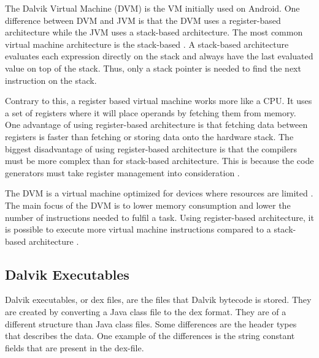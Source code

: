 
The Dalvik Virtual Machine (DVM) is the VM initially used on Android. One difference between DVM and JVM is that the DVM uses a register-based architecture while the JVM uses a stack-based architecture. The most common virtual machine architecture is the stack-based \cite[p.~158]{craig2010virtual}. A stack-based architecture evaluates each expression directly on the stack and always have the last evaluated value on top of the stack. Thus, only a stack pointer is needed to find the next instruction on the stack.

Contrary to this, a register based virtual machine works more like a CPU. It uses a set of registers where it will place operands by fetching them from memory. One advantage of using register-based architecture is that fetching data between registers is faster than fetching or storing data onto the hardware stack. The biggest disadvantage of using register-based architecture is that the compilers must be more complex than for stack-based architecture. This is because the code generators must take register management into consideration \cite[p.~159-160]{craig2010virtual}.

The DVM is a virtual machine optimized for devices where resources are limited \cite{android:dalvik:internals}. The main focus of the DVM is to lower memory consumption and lower the number of instructions needed to fulfil a task. Using register-based architecture, it is possible to execute more virtual machine instructions compared to a stack-based architecture \cite{shi2008virtual}. 



\subsection{Dalvik Executables}
Dalvik executables, or dex files, are the files that Dalvik bytecode is stored. They are created by converting a Java class file to the dex format. They are of a different structure than Java class files. Some differences are the header types that describes the data. One example of the differences is the string constant fields that are present in the dex-file. %


